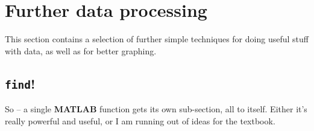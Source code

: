 \documentclass{tufte-book} %
\begin{document}

\newpage


\section{Further data processing}

This section contains a selection of further simple techniques for doing useful stuff with data, as well as for better graphing.

%
\newpage


\subsection{\texttt{find}!}

So -- a single \textbf{MATLAB} function gets its own sub-section, all to itself. Either it's really powerful and useful, or I am running out of ideas for the textbook.
\end{document}
